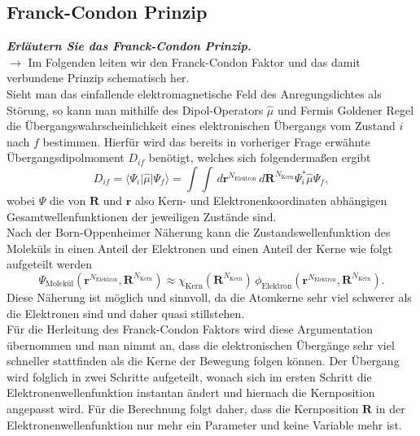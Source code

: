 \subsection{\label{subsec:FZV2}Franck-Condon Prinzip}
\textbf{\textit{Erläutern Sie das Franck-Condon Prinzip.}} \\
$\rightarrow$
Im Folgenden leiten wir den Franck-Condon Faktor und das damit verbundene Prinzip
schematisch her. \\
Sieht man das einfallende elektromagnetische Feld des Anregungslichtes als
Störung, so kann man mithilfe des Dipol-Operators $\hat{\mu}$ und
Fermis Goldener Regel die Übergangswahrscheinlichkeit eines elektronischen
Übergangs vom Zustand $i$ nach $f$ bestimmen. \newpage
Hierfür wird das bereits
in vorheriger Frage erwähnte Übergangsdipolmoment $D_{if}$ benötigt, welches sich
folgendermaßen ergibt
\begin{equation}\label{eq:deflangle}
    D_{if} = \langle\Psi_{i}\vert \hat{\mu} \vert \Psi_{f}\rangle = \int\int\,d\mathbf{r}^{N_{\text{Elektron}}}\,d\mathbf{R}^{N_{\text{Kern}}} \Psi_{i}^{*}\hat{\mu}\Psi_{f},
\end{equation}
wobei $\Psi$ die von $\mathbf{R}$ und $\mathbf{r}$ also Kern- und Elektronenkoordinaten abhängigen Gesamtwellenfunktionen
der jeweiligen Zustände sind. \\
Nach der Born-Oppenheimer Näherung kann die Zustandswellenfunktion des Moleküls in einen Anteil der
Elektronen und einen Anteil der Kerne wie folgt aufgeteilt werden
\begin{equation}
    \Psi_{\text{Molekül}}(\mathbf{r}^{N_{\text{Elektron}}}, \mathbf{R}^{N_{\text{Kern}}}) \approx \chi_{\text{Kern}}(\mathbf{R}^{N_{\text{Kern}}})\,\phi_{\text{Elektron}}(\mathbf{r}^{N_{\text{Elektron}}}, \mathbf{R}^{N_{\text{Kern}}}).
\end{equation}
Diese Näherung ist möglich und sinnvoll, da die Atomkerne sehr viel schwerer als die Elektronen sind und daher quasi stillstehen. \\
Für die Herleitung des Franck-Condon Faktors wird diese Argumentation übernommen und man nimmt an, dass die elektronischen
Übergänge sehr viel schneller stattfinden als die Kerne der Bewegung folgen können. Der Übergang wird folglich
in zwei Schritte aufgeteilt, wonach sich im ersten Schritt die Elektronenwellenfunktion instantan ändert
und hiernach die Kernposition angepasst wird. Für die Berechnung folgt daher, dass die Kernposition
$\mathbf{R}$ in der Elektronenwellenfunktion nur mehr ein Parameter und keine Variable mehr ist. \\
